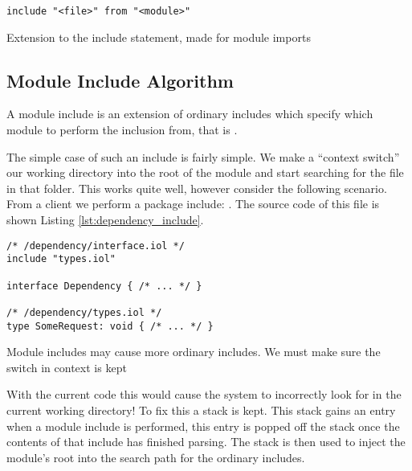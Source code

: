 \begin{listing}[H]
\begin{verbatim}
include "<file>" from "<module>"
\end{verbatim}
\caption{Extension to the include statement, made for module imports}
\label{lst:mod_include}
\end{listing}

\subsection{Module Include Algorithm}

A module include is an extension of ordinary includes which specify which
module to perform the inclusion from, that is .

The simple case of such an include is fairly simple. We make a ``context
switch'' our working directory into the root of the module and start searching
for the file in that folder. This works quite well, however consider the
following scenario. From a client we perform a package include: . The source code of this file is shown
Listing \ref{lst:dependency_include}.

\begin{listing}[H]
\begin{verbatim}
/* /dependency/interface.iol */
include "types.iol"

interface Dependency { /* ... */ }

/* /dependency/types.iol */
type SomeRequest: void { /* ... */ }
\end{verbatim}

\caption{Module includes may cause more ordinary includes. We must make sure
    the switch in context is kept}

\label{lst:dependency_include}
\end{listing}

With the current code this would cause the system to incorrectly look for
 in the current working directory! To fix this a stack is kept.
This stack gains an entry when a module include is performed, this entry is
popped off the stack once the contents of that include has finished parsing.
The stack is then used to inject the module's root into the search path for the
ordinary includes.
